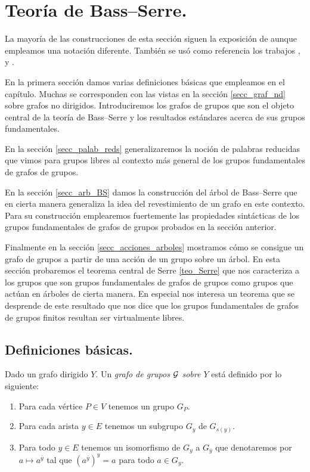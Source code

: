 \documentclass[tesis.tex]{subfiles}
\begin{document}
\chapter{Teoría de Bass--Serre.}\label{cap_BS}

La mayoría de las construcciones de esta sección siguen la exposición de \cite{serre2002trees} aunque empleamos una notación diferente. 
También se usó como referencia los trabajos \cite{scott1979topological}, \cite{diekert2017context} y \cite{dicks1989groups}.

En la primera sección damos varias definiciones básicas que empleamos en el capítulo. 
Muchas se corresponden con las vistas en la sección \ref{secc_graf_nd} sobre grafos no dirigidos.
Introduciremos los grafos de grupos que son el objeto central de la teoría de Bass--Serre y los resultados estándares acerca de sus grupos fundamentales.

En la sección \ref{secc_palab_reds} generalizaremos la noción de palabras reducidas que vimos para grupos libres al contexto más general de los grupos fundamentales de grafos de grupos.

En la sección \ref{secc_arb_BS} damos la construcción del árbol de Bass--Serre que en cierta manera generaliza la idea del revestimiento de un grafo en este contexto.
Para su construcción emplearemos fuertemente las propiedades sintácticas de los grupos fundamentales de grafos de grupos probados en la sección anterior.

Finalmente en la sección \ref{secc_acciones_arboles} mostramos cómo se consigue un grafo de grupos a partir de una acción de un grupo sobre un árbol.
En esta sección probaremos el teorema central de Serre \ref{teo_Serre} que nos caracteriza a los grupos que son grupos fundamentales de grafos de grupos como grupos que actúan en árboles de cierta manera.
En especial nos interesa un teorema que se desprende de este resultado que nos dice que los grupos fundamentales de grafos de grupos finitos resultan ser virtualmente libres. 



\section{Definiciones básicas.}\label{secc_defs_basicas}

\begin{deff}
	Dado un grafo dirigido $Y$.
	Un \emph{grafo de grupos $\cal G$ sobre $Y$} está definido por lo siguiente:
	\begin{enumerate}
		\item Para cada vértice $P \in V$ tenemos un grupo $G_P$.
		\item  Para cada arista $y \in E$ tenemos un subgrupo $G_y$ de $G_{s(y)}$.
		\item Para todo $y \in E$ tenemos un isomorfismo de $G_y$ a $G_{\overline y}$ que denotaremos por $a \mapsto a^{\overline y} $ tal que $(a^{\overline y})^y  = a$ para todo $a \in G_y$.
	\end{enumerate}
\end{deff}
\end{document}
